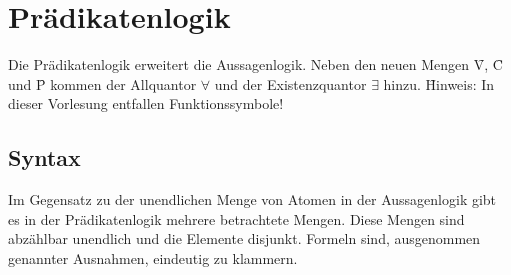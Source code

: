 \section{Prädikatenlogik}
Die Prädikatenlogik erweitert die Aussagenlogik. Neben den neuen Mengen \f{V}, \f{C} und \f{P} kommen der Allquantor $\forall$ und der Existenzquantor $\exists$ hinzu. \f{Hinweis:} In dieser Vorlesung entfallen Funktionssymbole! 
\subsection{Syntax}
    Im Gegensatz zu der unendlichen Menge von Atomen in der Aussagenlogik gibt es in der Prädikatenlogik mehrere betrachtete Mengen. Diese Mengen sind abzählbar unendlich und die Elemente disjunkt. Formeln sind, ausgenommen genannter Ausnahmen, eindeutig zu klammern.
